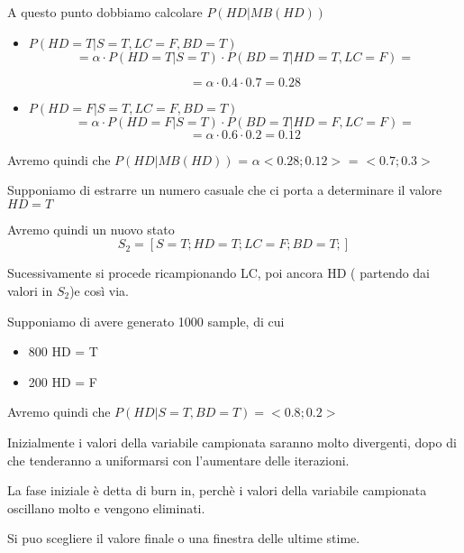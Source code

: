 \documentclass{article}
\begin{document}
A questo punto dobbiamo calcolare \(P(HD | MB(HD))\)

\begin{itemize}
	\item \(P(HD = T | S= T, LC = F, BD = T  )\)
	\[
	 = \alpha \cdot P(HD = T | S = T) \cdot P(BD = T | HD = T, LC = F) =
	\]
	
	\[
	= \alpha \cdot 0.4 \cdot 0.7  = 0.28
	\]
	
	
	\item \(P(HD = F | S = T, LC = F, BD = T)\)
	\[
	 = \alpha \cdot P(HD = F | S = T) \cdot P(BD = T | HD = F, LC = F) =
	\]
	\[
	= \alpha \cdot 0.6 \cdot 0.2 = 0.12
	\]
\end{itemize}

Avremo quindi che \(P(HD | MB(HD))\) = \(\alpha <0.28; 0.12>\) = \(<0.7; 0.3>\)

Supponiamo di estrarre un numero casuale che ci porta a determinare il valore \(HD = T\)

Avremo quindi un nuovo stato 
\[
S_2 = [S = T; HD = T; LC =F; BD = T;]
\]


Sucessivamente si procede ricampionando LC, poi ancora HD ( partendo dai valori in $S_2$)e così via.


Supponiamo di avere generato 1000 sample, di cui 

\begin{itemize}

\item 800 HD = T
\item 200 HD = F

\end{itemize}

Avremo quindi che \(P(HD | S = T, BD = T) = <0.8;0.2>\)

Inizialmente i valori della variabile campionata saranno molto divergenti, dopo di che tenderanno a uniformarsi con l'aumentare delle iterazioni.

La fase iniziale è detta di burn in, perchè i valori della variabile campionata oscillano molto e vengono eliminati.

Si puo scegliere il valore finale o una finestra delle ultime stime.
\end{document}

